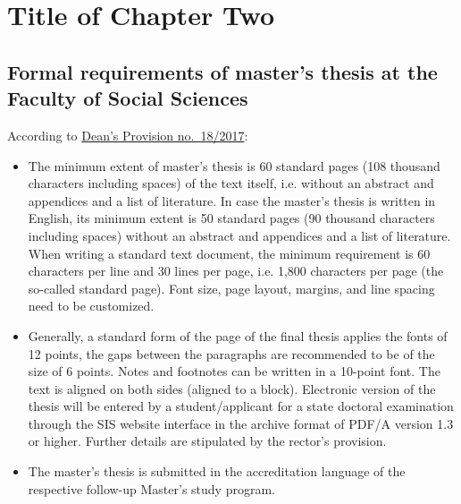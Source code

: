 \chapter{Title of Chapter Two}
\label{chap:two}


\section{Formal requirements of master's thesis at the Faculty of Social Sciences}
\label{sec:formal}

According to \href{https://www.fsv.cuni.cz/deans-provision-no-182017}{Dean's Provision no.\ 18/2017}:
\begin{itemize}
		\item  The minimum extent of master's thesis is 60 standard pages (108 thousand characters including spaces) of the text itself, i.e. without an abstract and appendices and a list of literature. In case the master's thesis is written in English, its minimum extent is 50 standard pages (90 thousand characters including spaces) without an abstract and appendices and a list of literature. When writing a standard text document, the minimum requirement is 60 characters per line and 30 lines per page, i.e. 1,800 characters per page (the so-called standard page). Font size, page layout, margins, and line spacing need to be customized.
		\item Generally, a standard form of the page of the final thesis applies the fonts of 12 points, the gaps between the paragraphs are recommended to be of the size of 6 points. Notes and footnotes can be written in a 10-point font. The text is aligned on both sides (aligned to a block). Electronic version of the thesis will be entered by a student/applicant for a state doctoral examination through the SIS website interface in the archive format of PDF/A version 1.3 or higher. Further details are stipulated by the rector's provision.
		\item The master's thesis is submitted in the accreditation language of the respective follow-up Master's study program. 
\end{itemize}





